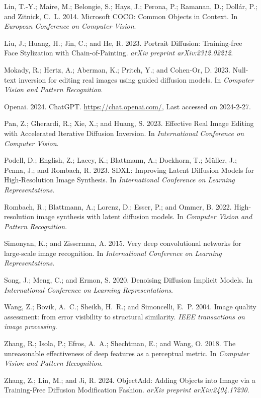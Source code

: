 \documentclass[letterpaper]{article} \usepackage{aaai25}  \usepackage{times}  \usepackage{helvet}  \usepackage{courier}  \usepackage[hyphens]{url}  \usepackage{graphicx} \urlstyle{rm} \def\UrlFont{\rm}  \usepackage{natbib}  \usepackage{caption} \frenchspacing  \setlength{\pdfpagewidth}{8.5in} \setlength{\pdfpageheight}{11in} \usepackage{algorithm}
\begin{document}
\begin{thebibliography}{22}
Lin, T.-Y.; Maire, M.; Belongie, S.; Hays, J.; Perona, P.; Ramanan, D.; Doll{\'a}r, P.; and Zitnick, C.~L. 2014.
\newblock Microsoft COCO: Common Objects in Context.
\newblock In \emph{European Conference on Computer Vision}.

Liu, J.; Huang, H.; Jin, C.; and He, R. 2023.
\newblock Portrait Diffusion: Training-free Face Stylization with Chain-of-Painting.
\newblock \emph{arXiv preprint arXiv:2312.02212}.

Mokady, R.; Hertz, A.; Aberman, K.; Pritch, Y.; and Cohen-Or, D. 2023.
\newblock Null-text inversion for editing real images using guided diffusion models.
\newblock In \emph{Computer Vision and Pattern Recognition}.

{Openai}. 2024.
\newblock ChatGPT.
\newblock \url{https://chat.openai.com/}, Last accessed on 2024-2-27.

Pan, Z.; Gherardi, R.; Xie, X.; and Huang, S. 2023.
\newblock Effective Real Image Editing with Accelerated Iterative Diffusion Inversion.
\newblock In \emph{International Conference on Computer Vision}.

Podell, D.; English, Z.; Lacey, K.; Blattmann, A.; Dockhorn, T.; M{\"u}ller, J.; Penna, J.; and Rombach, R. 2023.
\newblock SDXL: Improving Latent Diffusion Models for High-Resolution Image Synthesis.
\newblock In \emph{International Conference on Learning Representations}.

Rombach, R.; Blattmann, A.; Lorenz, D.; Esser, P.; and Ommer, B. 2022.
\newblock High-resolution image synthesis with latent diffusion models.
\newblock In \emph{Computer Vision and Pattern Recognition}.

Simonyan, K.; and Zisserman, A. 2015.
\newblock Very deep convolutional networks for large-scale image recognition.
\newblock In \emph{International Conference on Learning Representations}.

Song, J.; Meng, C.; and Ermon, S. 2020.
\newblock Denoising Diffusion Implicit Models.
\newblock In \emph{International Conference on Learning Representations}.

Wang, Z.; Bovik, A.~C.; Sheikh, H.~R.; and Simoncelli, E.~P. 2004.
\newblock Image quality assessment: from error visibility to structural similarity.
\newblock \emph{IEEE transactions on image processing}.

Zhang, R.; Isola, P.; Efros, A.~A.; Shechtman, E.; and Wang, O. 2018.
\newblock The unreasonable effectiveness of deep features as a perceptual metric.
\newblock In \emph{Computer Vision and Pattern Recognition}.

Zhang, Z.; Lin, M.; and Ji, R. 2024.
\newblock ObjectAdd: Adding Objects into Image via a Training-Free Diffusion Modification Fashion.
\newblock \emph{arXiv preprint arXiv:2404.17230}.

\end{thebibliography}
 
\end{document}
